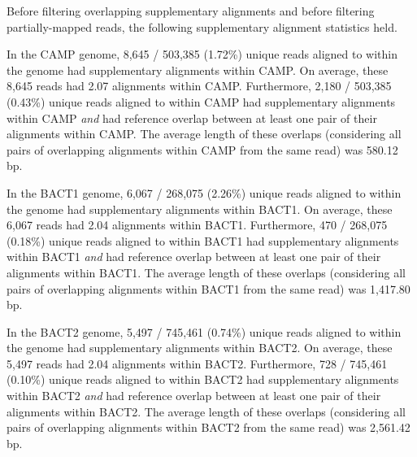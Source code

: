 Before filtering overlapping supplementary alignments and before filtering
partially-mapped reads, the following supplementary alignment statistics held.

In the CAMP genome, 8,645 / 503,385 (1.72\%) unique reads aligned to within the genome had supplementary alignments within CAMP.
On average, these 8,645 reads had 2.07 alignments within CAMP.
Furthermore, 2,180 / 503,385 (0.43\%) unique reads aligned to within CAMP had supplementary alignments within CAMP \emph{and} had reference overlap between at least one pair of their alignments within CAMP.
The average length of these overlaps (considering all pairs of overlapping alignments within CAMP from the same read) was 580.12 bp.

In the BACT1 genome, 6,067 / 268,075 (2.26\%) unique reads aligned to within the genome had supplementary alignments within BACT1.
On average, these 6,067 reads had 2.04 alignments within BACT1.
Furthermore, 470 / 268,075 (0.18\%) unique reads aligned to within BACT1 had supplementary alignments within BACT1 \emph{and} had reference overlap between at least one pair of their alignments within BACT1.
The average length of these overlaps (considering all pairs of overlapping alignments within BACT1 from the same read) was 1,417.80 bp.

In the BACT2 genome, 5,497 / 745,461 (0.74\%) unique reads aligned to within the genome had supplementary alignments within BACT2.
On average, these 5,497 reads had 2.04 alignments within BACT2.
Furthermore, 728 / 745,461 (0.10\%) unique reads aligned to within BACT2 had supplementary alignments within BACT2 \emph{and} had reference overlap between at least one pair of their alignments within BACT2.
The average length of these overlaps (considering all pairs of overlapping alignments within BACT2 from the same read) was 2,561.42 bp.
\endinput